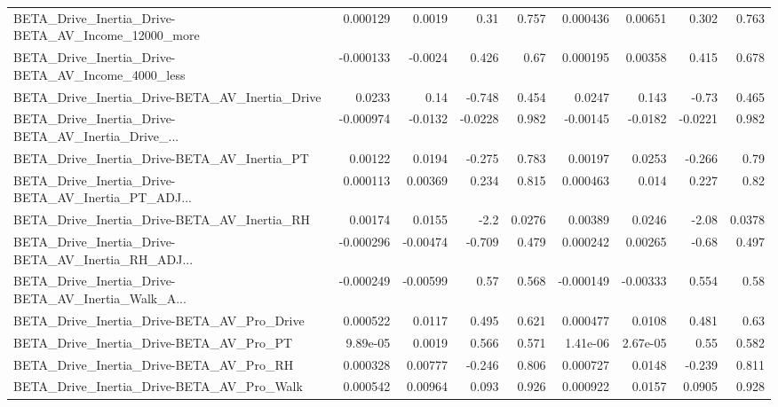 \begin{tabular}{lrrrrrrrr}
BETA\_Drive\_Inertia\_Drive-BETA\_AV\_Income\_12000\_more &    0.000129 &       0.0019 &     0.31 &    0.757 &   0.000436 &     0.00651 &        0.302 &         0.763 \\
BETA\_Drive\_Inertia\_Drive-BETA\_AV\_Income\_4000\_less  &   -0.000133 &      -0.0024 &    0.426 &     0.67 &   0.000195 &     0.00358 &        0.415 &         0.678 \\
BETA\_Drive\_Inertia\_Drive-BETA\_AV\_Inertia\_Drive     &      0.0233 &         0.14 &   -0.748 &    0.454 &     0.0247 &       0.143 &        -0.73 &         0.465 \\
BETA\_Drive\_Inertia\_Drive-BETA\_AV\_Inertia\_Drive\_... &   -0.000974 &      -0.0132 &  -0.0228 &    0.982 &   -0.00145 &     -0.0182 &      -0.0221 &         0.982 \\
BETA\_Drive\_Inertia\_Drive-BETA\_AV\_Inertia\_PT        &     0.00122 &       0.0194 &   -0.275 &    0.783 &    0.00197 &      0.0253 &       -0.266 &          0.79 \\
BETA\_Drive\_Inertia\_Drive-BETA\_AV\_Inertia\_PT\_ADJ... &    0.000113 &      0.00369 &    0.234 &    0.815 &   0.000463 &       0.014 &        0.227 &          0.82 \\
BETA\_Drive\_Inertia\_Drive-BETA\_AV\_Inertia\_RH        &     0.00174 &       0.0155 &     -2.2 &   0.0276 &    0.00389 &      0.0246 &        -2.08 &        0.0378 \\
BETA\_Drive\_Inertia\_Drive-BETA\_AV\_Inertia\_RH\_ADJ... &   -0.000296 &     -0.00474 &   -0.709 &    0.479 &   0.000242 &     0.00265 &        -0.68 &         0.497 \\
BETA\_Drive\_Inertia\_Drive-BETA\_AV\_Inertia\_Walk\_A... &   -0.000249 &     -0.00599 &     0.57 &    0.568 &  -0.000149 &    -0.00333 &        0.554 &          0.58 \\
BETA\_Drive\_Inertia\_Drive-BETA\_AV\_Pro\_Drive         &    0.000522 &       0.0117 &    0.495 &    0.621 &   0.000477 &      0.0108 &        0.481 &          0.63 \\
BETA\_Drive\_Inertia\_Drive-BETA\_AV\_Pro\_PT            &    9.89e-05 &       0.0019 &    0.566 &    0.571 &   1.41e-06 &    2.67e-05 &         0.55 &         0.582 \\
BETA\_Drive\_Inertia\_Drive-BETA\_AV\_Pro\_RH            &    0.000328 &      0.00777 &   -0.246 &    0.806 &   0.000727 &      0.0148 &       -0.239 &         0.811 \\
BETA\_Drive\_Inertia\_Drive-BETA\_AV\_Pro\_Walk          &    0.000542 &      0.00964 &    0.093 &    0.926 &   0.000922 &      0.0157 &       0.0905 &         0.928 \\

\end{tabular}
